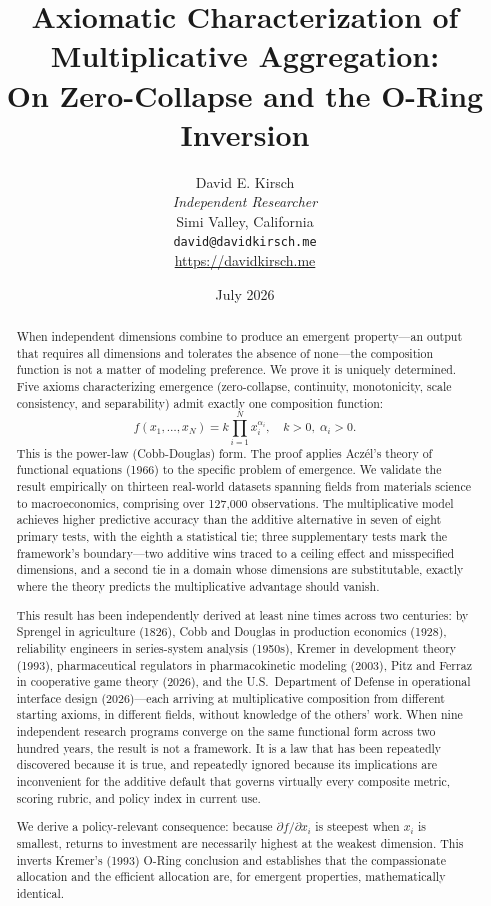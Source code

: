 \documentclass[12pt, a4paper]{article}
\title{\textbf{Axiomatic Characterization of Multiplicative Aggregation:\\ On Zero-Collapse and the O-Ring Inversion}}
\author{David E. Kirsch\\
\textit{Independent Researcher}\\
Simi Valley, California\\
\texttt{david@davidkirsch.me}\\
\url{https://davidkirsch.me}}
\date{July 2026}
\theoremstyle{definition}
\theoremstyle{remark}
\begin{document}
\maketitle

\begin{abstract}
When independent dimensions combine to produce an emergent property---an output that requires all dimensions and tolerates the absence of none---the composition function is not a matter of modeling preference. We prove it is uniquely determined. Five axioms characterizing emergence (zero-collapse, continuity, monotonicity, scale consistency, and separability) admit exactly one composition function:
\[
f(x_1, \ldots, x_N) = k \prod_{i=1}^{N} x_i^{\alpha_i}, \quad k > 0, \; \alpha_i > 0.
\]
This is the power-law (Cobb-Douglas) form. The proof applies Acz\'el's theory of functional equations (1966) to the specific problem of emergence. We validate the result empirically on thirteen real-world datasets spanning fields from materials science to macroeconomics, comprising over 127,000 observations. The multiplicative model achieves higher predictive accuracy than the additive alternative in seven of eight primary tests, with the eighth a statistical tie; three supplementary tests mark the framework's boundary---two additive wins traced to a ceiling effect and misspecified dimensions, and a second tie in a domain whose dimensions are substitutable, exactly where the theory predicts the multiplicative advantage should vanish.

This result has been independently derived at least nine times across two centuries: by Sprengel in agriculture (1826), Cobb and Douglas in production economics (1928), reliability engineers in series-system analysis (1950s), Kremer in development theory (1993), pharmaceutical regulators in pharmacokinetic modeling (2003), Pitz and Ferraz in cooperative game theory (2026), and the U.S.\ Department of Defense in operational interface design (2026)---each arriving at multiplicative composition from different starting axioms, in different fields, without knowledge of the others' work. When nine independent research programs converge on the same functional form across two hundred years, the result is not a framework. It is a law that has been repeatedly discovered because it is true, and repeatedly ignored because its implications are inconvenient for the additive default that governs virtually every composite metric, scoring rubric, and policy index in current use.

We derive a policy-relevant consequence: because $\partial f / \partial x_i$ is steepest when $x_i$ is smallest, returns to investment are necessarily highest at the weakest dimension. This inverts Kremer's (1993) O-Ring conclusion and establishes that the compassionate allocation and the efficient allocation are, for emergent properties, mathematically identical.
\end{abstract}
\end{document}
